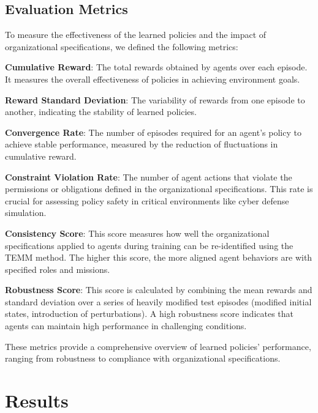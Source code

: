 \documentclass[sigconf,anonymous]{aamas}
\begin{document}
\subsection{Evaluation Metrics}

To measure the effectiveness of the learned policies and the impact of organizational specifications, we defined the following metrics:

\begin{enumerate*}[label={\roman*)}, itemjoin={; \quad}]
    \item \textbf{Cumulative Reward}: The total rewards obtained by agents over each episode. It measures the overall effectiveness of policies in achieving environment goals.
    \item \textbf{Reward Standard Deviation}: The variability of rewards from one episode to another, indicating the stability of learned policies.
    \item \textbf{Convergence Rate}: The number of episodes required for an agent's policy to achieve stable performance, measured by the reduction of fluctuations in cumulative reward.
    \item \textbf{Constraint Violation Rate}: The number of agent actions that violate the permissions or obligations defined in the organizational specifications. This rate is crucial for assessing policy safety in critical environments like cyber defense simulation.
    \item \textbf{Consistency Score}: This score measures how well the organizational specifications applied to agents during training can be re-identified using the TEMM method. The higher this score, the more aligned agent behaviors are with specified roles and missions.
    \item \textbf{Robustness Score}: This score is calculated by combining the mean rewards and standard deviation over a series of heavily modified test episodes (modified initial states, introduction of perturbations). A high robustness score indicates that agents can maintain high performance in challenging conditions.
\end{enumerate*}

These metrics provide a comprehensive overview of learned policies' performance, ranging from robustness to compliance with organizational specifications.

\section{Results}
\label{sec:results}
\end{document}
